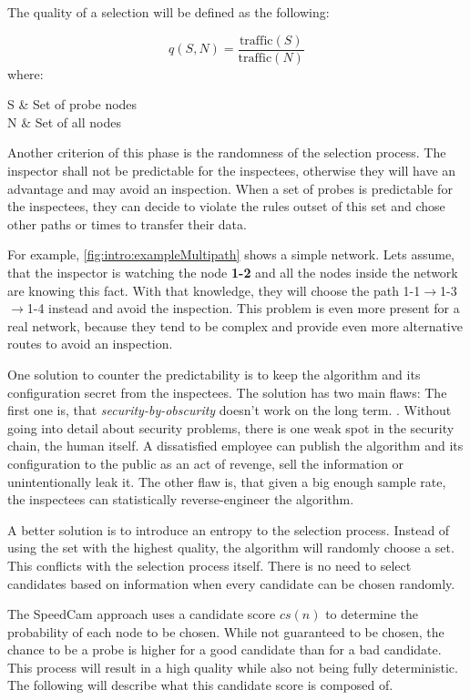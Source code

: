 \documentclass[thesis.tex]{subfiles}
\begin{document}
The quality of a selection will be defined as the following:

\begin{equation} \label{equo:qualitySelection}
q(S,N) = \frac{\text{traffic}(S)}{\text{traffic}(N)}
\end{equation}
where:
\begin{conditions}
    S     &  Set of probe nodes \\
    N     &  Set of all nodes
\end{conditions}

Another criterion of this phase is the randomness of the selection process. The inspector shall not be predictable for the inspectees, otherwise they will have an advantage and may avoid an inspection. When a set of probes is predictable for the inspectees, they can decide to violate the rules outset of this set and chose other paths or times to transfer their data. 

For example, \autoref{fig:intro:exampleMultipath} shows a simple network. Lets assume, that the inspector is watching the node \textbf{1-2} and all the nodes inside the network are knowing this fact. With that knowledge, they will choose the path 1-1$\rightarrow$1-3$\rightarrow$1-4 instead and avoid the inspection. This problem is even more present for a real network, because they tend to be complex and provide even more alternative routes to avoid an inspection.

One solution to counter the predictability is to keep the algorithm and its configuration secret from the inspectees. The solution has two main flaws: The first one is, that \textit{security-by-obscurity} doesn't work on the long term. . Without going into detail about security problems, there is one weak spot in the security chain, the human itself. A dissatisfied employee can publish the algorithm and its configuration to the public as an act of revenge, sell the information or unintentionally leak it. The other flaw is, that given a big enough sample rate, the inspectees can statistically reverse-engineer the algorithm. 

A better solution is to introduce an entropy to the selection process. Instead of using the set with the highest quality, the algorithm will randomly choose a set. This conflicts with the selection process itself. There is no need to select candidates based on information when every candidate can be chosen randomly.

The SpeedCam approach uses a candidate score $cs(n)$ to determine the probability of each node to be chosen. While not guaranteed to be chosen, the chance to be a probe is higher for a good candidate than for a bad candidate. This process will result in a high quality while also not being fully deterministic. The following will describe what this candidate score is composed of.
\end{document}
